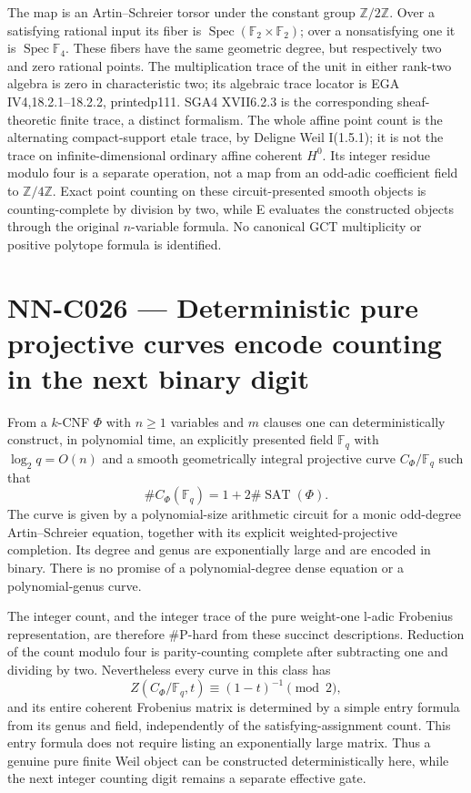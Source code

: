 The map is an Artin--Schreier torsor under the constant group $\mathbb Z/2\mathbb Z$. Over a satisfying rational input its fiber is $\operatorname{Spec}(\mathbb F_2\times\mathbb F_2)$; over a nonsatisfying one it is $\operatorname{Spec}\mathbb F_4$. These fibers have the same geometric degree, but respectively two and zero rational points. The multiplication trace of the unit in either rank-two algebra is zero in characteristic two; its algebraic trace locator is EGA IV4,18.2.1--18.2.2, printedp111. SGA4 XVII6.2.3 is the corresponding sheaf-theoretic finite trace, a distinct formalism. The whole affine point count is the alternating compact-support etale trace, by Deligne Weil I(1.5.1); it is not the trace on infinite-dimensional ordinary affine coherent $H^0$. Its integer residue modulo four is a separate operation, not a map from an odd-adic coefficient field to $\mathbb Z/4\mathbb Z$. Exact point counting on these circuit-presented smooth objects is counting-complete by division by two, while E evaluates the constructed objects through the original $n$-variable formula. No canonical GCT multiplicity or positive polytope formula is identified.



\section{NN-C026 --- Deterministic pure projective curves encode counting in the next binary digit}
\begin{proposition}[NN-C026]
From a $k$-CNF $\Phi$ with $n\geq1$ variables and $m$ clauses one can deterministically construct, in polynomial time, an explicitly presented field $\mathbb F_q$ with $\log_2q=O(n)$ and a smooth geometrically integral projective curve $C_\Phi/\mathbb F_q$ such that
\[
               \#C_\Phi(\mathbb F_q)=1+2\#\operatorname{SAT}(\Phi).
\]
The curve is given by a polynomial-size arithmetic circuit for a monic odd-degree Artin--Schreier equation, together with its explicit weighted-projective completion. Its degree and genus are exponentially large and are encoded in binary. There is no promise of a polynomial-degree dense equation or a polynomial-genus curve.

The integer count, and the integer trace of the pure weight-one l-adic Frobenius representation, are therefore $\#\mathrm P$-hard from these succinct descriptions. Reduction of the count modulo four is parity-counting complete after subtracting one and dividing by two. Nevertheless every curve in this class has
\[
 Z(C_\Phi/\mathbb F_q,t)\equiv(1-t)^{-1}\pmod2,
\]
and its entire coherent Frobenius matrix is determined by a simple entry formula from its genus and field, independently of the satisfying-assignment count. This entry formula does not require listing an exponentially large matrix. Thus a genuine pure finite Weil object can be constructed deterministically here, while the next integer counting digit remains a separate effective gate.
\end{proposition}
